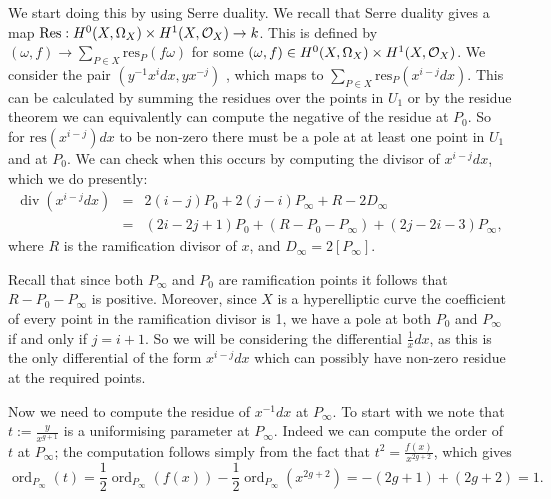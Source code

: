 \documentclass[draft, 11pt]{article} %
\theoremstyle{plain}
\theoremstyle{remark}
\newcommand{\cO}{{\cal O}}
\DeclareMathOperator{\ord}{ord}
\DeclareMathOperator{\di}{div}
\begin{document}
We start doing this by using Serre duality.
We recall that Serre duality gives a map $\text{Res}: H^0(X,\Omega_X) \times H^1(X,\cO_X) \rightarrow k$.
This is defined by  $(\omega,f) \rightarrow \sum_{P\in X}\text{res}_P(f\omega)$ for some $(\omega, f) \in   H^0(X,\Omega_X) \times H^1(X,\cO_X)$.
We consider the pair $(y^{-1}x^idx,yx^{-j})$ 
, which maps to $\sum_{P\in X} \text{res}_P (x^{i-j}dx)$. 
This can be calculated by summing the residues over the points in $U_1$ or by the residue theorem we can equivalently can compute the negative of the residue at $P_0$.
So for $\text{res}(x^{i-j})dx$ to be non-zero there must be a pole at at least one point in $U_1$ and at $P_0$.
We can check when this occurs by computing the divisor of $x^{i-j}dx$, which we do presently:
\begin{eqnarray}
	\di(x^{i-j}dx) & = &  2(i-j)P_0 +  2(j-i)P_\infty + R - 2D_\infty \\
	& = & (2i-2j+1)P_0 +(R-P_0-P_\infty) +(2j-2i-3)P_\infty,
\end{eqnarray}
where $R$ is the ramification divisor of $x$, and $D_\infty = 2[P_\infty]$.

Recall that since both $P_\infty$ and $P_0$ are ramification points it follows that $R-P_0-P_\infty$ is positive.
Moreover, since $X$ is a hyperelliptic curve the coefficient of every point in the ramification divisor is 1, we have a pole at both $P_0$ and $P_\infty$ if and only if $j=i+1$.
So we will be considering the differential $\frac{1}{x}dx$, as this is the only differential of the form $x^{i-j}dx$ which can possibly have non-zero residue at the required points.


Now we need to compute the residue of $x^{-1}dx$ at $P_\infty$.
To start with we note that $t:= \frac{y}{x^{g+1}}$ is a uniformising parameter at $P_\infty$.
Indeed we can compute the order of $t$ at $P_\infty$; the computation follows simply from the fact that $t^2 = \frac{f(x)}{x^{2g+2}}$, which gives
\[
\ord_{P_\infty}(t) = \frac{1}{2}\ord_{P_\infty}(f(x)) - \frac{1}{2}\ord_{P_\infty}(x^{2g+2}) = -(2g+1) + (2g+2) = 1.
\]
\end{document}

